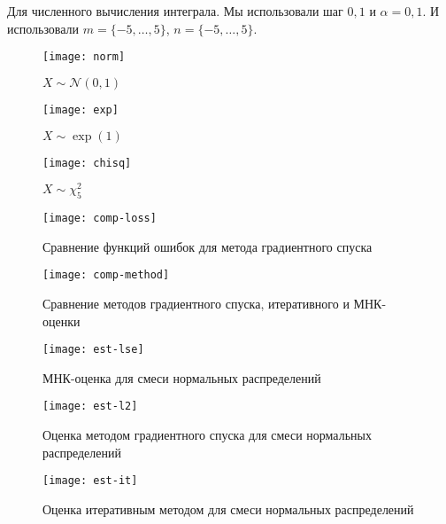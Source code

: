 \documentclass[../paper.tex]{subfiles}
\begin{document}
\bigskip

Для численного вычисления интеграла. Мы использовали шаг $0{,}1$ и $\alpha = 0{,}1$. И использовали $m=\{-5, \dots, 5\}$, $n=\{-5, \dots, 5\}$.

\begin{figure}[h]
    \caption{$X \sim \mathcal{N}(0, 1)$}
    \centering
    \texttt{[image: norm]}
\end{figure}

\begin{figure}[h]
    \caption{$X \sim \exp(1)$}
    \centering
    \texttt{[image: exp]}
\end{figure}

\begin{figure}[h]
    \caption{$X \sim \chi^2_5$}
    \centering
    \texttt{[image: chisq]}
\end{figure}

\begin{figure}[h]
  \caption{Сравнение функций ошибок для метода градиентного спуска}
  \centering
  \texttt{[image: comp-loss]}
\end{figure}

\begin{figure}[h]
  \caption{Сравнение методов градиентного спуска, итеративного и МНК-оценки}
  \centering
  \texttt{[image: comp-method]}
\end{figure}

\begin{figure}[h]
  \caption{МНК-оценка для смеси нормальных распределений}
  \centering
  \texttt{[image: est-lse]}
\end{figure}

\begin{figure}[h]
  \caption{Оценка методом градиентного спуска для смеси нормальных распределений}
  \centering
  \texttt{[image: est-l2]}
\end{figure}

\begin{figure}[h]
  \caption{Оценка итеративным методом для смеси нормальных распределений}
  \centering
  \texttt{[image: est-it]}
\end{figure}
\end{document}
